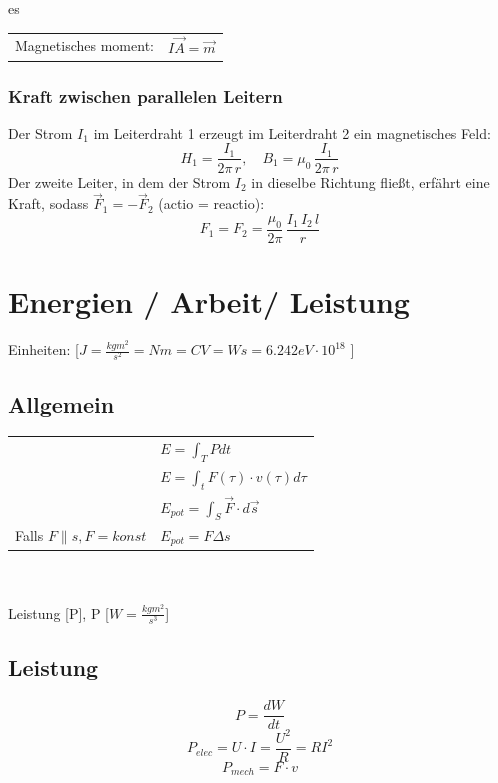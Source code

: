 es\documentclass[a4paper, fontsize=8pt, landscape]{scrartcl}
\begin{document}
\begin{multicols*}{4}
    \begin{tabular}[t]{@{}l l}
    Magnetisches moment: &$I\vec A = \vec m$\\
    \end{tabular}
\subsubsection{Kraft zwischen parallelen Leitern}
    Der Strom $I_1$ im Leiterdraht 1 erzeugt im Leiterdraht 2 ein magnetisches Feld:
    \[H_1 = \frac{I_1}{2\pi\,r}, \quad B_1 = \mu_0\,\frac{I_1}{2\pi\,r}\]
    Der zweite Leiter, in dem der Strom $I_2$ in dieselbe Richtung fließt, erfährt eine Kraft, sodass $\vec F_1 = -\vec F_2$ (actio = reactio):
    \[F_1 = F_2 = \frac{\mu_0}{2\pi}\,\frac{I_1\,I_2\,l}{r}\]

    
\columnbreak
\section{Energien / Arbeit/ Leistung}

    Einheiten:  [$J =  \frac{kgm^2}{s^2} =  Nm = CV = Ws =  6.242eV \cdot 10^{18}$ ]\\

\subsection{Allgemein}
    \begin{tabular}[t]{@{}l l}
    &\rule{0pt}{18pt} $E = \int_T P dt$ \\
    &\rule{0pt}{18pt} $E = \int_t F(\tau) \cdot v(\tau)d\tau$ \\
    &\rule{0pt}{18pt} $E_{pot} = \int_S \vec{F} \cdot d\vec{s}$  \\
    \rule{0pt}{18pt} Falls $F\parallel s , F = konst$ 
    & $E_{pot} = F\Delta s$\\
    
    \end{tabular}
    \\\\
    \noindent
    Leistung [P], 
    P [$W = \frac{kg m^2}{s^3}$]

\subsection{Leistung}
    \[P  = \frac{dW}{dt}\]
    \[P_{elec} = U\cdot I = \frac{U^2}{R} = R I^2 \]
    \[ P_{mech} = F\cdot v \]

\end{multicols*}
\end{document}
